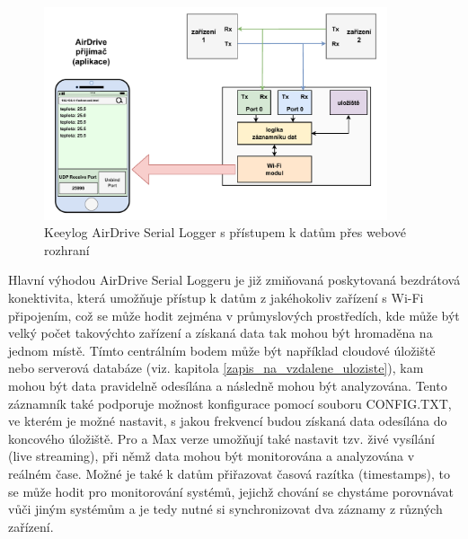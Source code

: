 \begin{figure}[h]
    \centering
    \includegraphics[width=0.90\textwidth]{obrazky-figures/keeylog_airdrive_serial_logger-cz.pdf}
    
    \caption{Keeylog AirDrive Serial Logger s přístupem k datům přes webové rozhraní \cite{keelog_airdrive_serial_datalogger, keelog_airdrive_serial_datalogger_scheme}}
    \label{fig:keelog-airdrive-serial-datalogger}
\end{figure}

Hlavní výhodou AirDrive Serial Loggeru je již zmiňovaná poskytovaná bezdrátová konektivita, která umožňuje přístup k datům z jakéhokoliv zařízení s Wi-Fi připojením, což se může hodit zejména v průmyslových  prostředích, kde může být velký počet takovýchto zařízení a získaná data tak mohou být hromaděna na jednom místě. Tímto centrálním bodem může být například cloudové úložiště nebo serverová databáze (viz. kapitola \ref{zapis_na_vzdalene_uloziste}), kam mohou být data pravidelně odesílána a následně mohou být analyzována. Tento záznamník také podporuje možnost konfigurace pomocí souboru CONFIG.TXT, ve kterém je možné nastavit, s jakou frekvencí budou získaná data odesílána do koncového úložiště. Pro a Max verze umožňují také nastavit tzv. živé vysílání (live streaming), při němž data mohou být monitorována a analyzována v reálném čase. Možné je také k datům přiřazovat časová razítka (timestamps), to se může hodit pro monitorování systémů, jejichž chování se chystáme porovnávat vůči jiným systémům a je tedy nutné si synchronizovat dva záznamy z různých zařízení. \cite{keelog_airdrive_serial_datalogger}

